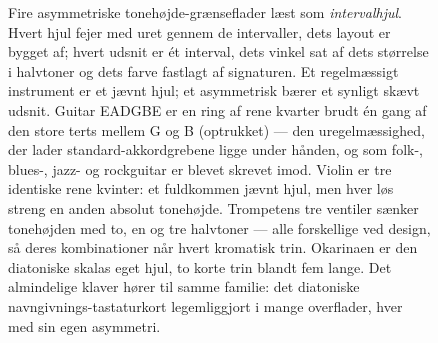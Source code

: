 \documentclass[10pt,letterpaper,twocolumn]{article}
\begin{document}
\begin{figure}[t]
{}
\endgroup
\caption{Fire asymmetriske tonehøjde-grænseflader læst som \emph{intervalhjul}. Hvert hjul fejer med uret gennem de intervaller, dets layout er bygget af; hvert udsnit er ét interval, dets vinkel sat af dets størrelse i halvtoner og dets farve fastlagt af signaturen. Et regelmæssigt instrument er et jævnt hjul; et asymmetrisk bærer et synligt skævt udsnit. Guitar EADGBE er en ring af rene kvarter brudt én gang af den store terts mellem G og B (optrukket) --- den uregelmæssighed, der lader standard-akkordgrebene ligge under hånden, og som folk-, blues-, jazz- og rockguitar er blevet skrevet imod. Violin er tre identiske rene kvinter: et fuldkommen jævnt hjul, men hver løs streng en anden absolut tonehøjde. Trompetens tre ventiler sænker tonehøjden med to, en og tre halvtoner --- alle forskellige ved design, så deres kombinationer når hvert kromatisk trin. Okarinaen er den diatoniske skalas eget hjul, to korte trin blandt fem lange. Det almindelige klaver hører til samme familie: det diatoniske navngivnings-tastaturkort legemliggjort i mange overflader, hver med sin egen asymmetri.}
\label{fig:asymmetric-instruments}
\end{figure}
\end{document}
